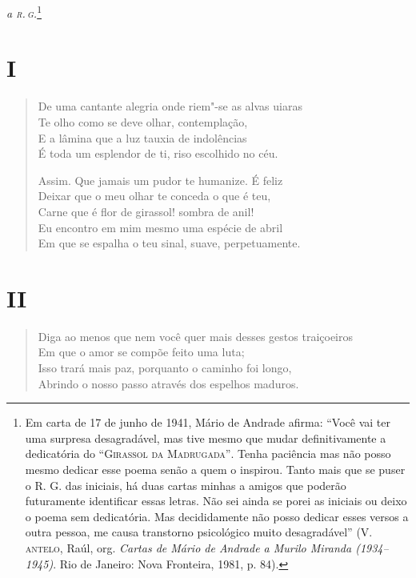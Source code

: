 {\begin{flushright}
\emph{a \textsc{r.\,g.}}\footnote[*]{Em carta de 17 de junho de 1941, Mário de
  Andrade afirma: ``Você vai ter uma surpresa desagradável, mas tive
  mesmo que mudar definitivamente a dedicatória do ``\textsc{Girassol da
  Madrugada''}. Tenha paciência mas não posso mesmo dedicar esse poema
  senão a quem o inspirou. Tanto mais que se puser o R. G. das iniciais,
  há duas cartas minhas a amigos que poderão futuramente identificar
  essas letras. Não sei ainda se porei as iniciais ou deixo o poema sem
  dedicatória. Mas decididamente não posso dedicar esses versos a outra
  pessoa, me causa transtorno psicológico muito desagradável'' (V.
  \textsc{antelo}, Raúl, org. \emph{Cartas de Mário de Andrade a Murilo Miranda
  (1934--1945)}. Rio de Janeiro: Nova Fronteira, 1981, p. 84).}
\end{flushright}

\section*{I}

\begin{verse}
De uma cantante alegria onde riem"-se as alvas uiaras\\
Te olho como se deve olhar, contemplação,\\
E a lâmina que a luz tauxia de indolências\\
É toda um esplendor de ti, riso escolhido no céu.

Assim. Que jamais um pudor te humanize. É feliz\\
Deixar que o meu olhar te conceda o que é teu,\\
Carne que é flor de girassol! sombra de anil!\\
Eu encontro em mim mesmo uma espécie de abril\\
Em que se espalha o teu sinal, suave, perpetuamente.
\end{verse}

\medskip
\section*{II}

\begin{verse}
Diga ao menos que nem você quer mais desses gestos traiçoeiros\\
Em que o amor se compõe feito uma luta;\\
Isso trará mais paz, porquanto o caminho foi longo,\\
Abrindo o nosso passo através dos espelhos maduros.


\end{verse}}
